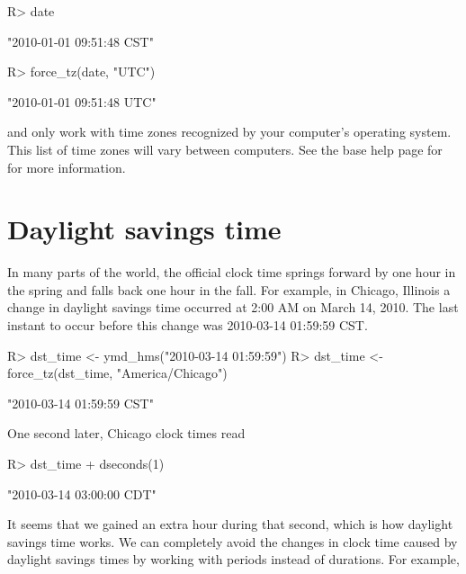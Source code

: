 \documentclass[article]{jss}
\begin{document}
\begin{CodeInput}
R> date
\end{CodeInput}
\begin{CodeOutput}
[1] "2010-01-01 09:51:48 CST"
\end{CodeOutput}

\begin{CodeInput}
R> force_tz(date, "UTC")
\end{CodeInput}
\begin{CodeOutput}
[1] "2010-01-01 09:51:48 UTC"
\end{CodeOutput}


 and  only work with time zones recognized by your computer's operating system. This list of time zones will vary between computers. See the base  help page for  for more information.

\section{Daylight savings time}
\label{sec:DST}

In many parts of the world, the official clock time springs forward by one hour in the spring and falls back one hour in the fall. For example, in Chicago, Illinois a change in daylight savings time occurred at 2:00 AM on March 14, 2010. The last instant to occur before this change was 2010-03-14 01:59:59 CST.

\begin{CodeInput}
R> dst_time <- ymd_hms("2010-03-14 01:59:59")
R> dst_time <- force_tz(dst_time, "America/Chicago")
\end{CodeInput}
\begin{CodeOutput}
[1] "2010-03-14 01:59:59 CST"
\end{CodeOutput}

One second later, Chicago clock times read

\begin{CodeInput}
R> dst_time + dseconds(1)
\end{CodeInput}
\begin{CodeOutput}
[1] "2010-03-14 03:00:00 CDT"
\end{CodeOutput}

It seems that we gained an extra hour during that second, which is how daylight savings time works. We can completely avoid the changes in clock time caused by daylight savings times by working with periods instead of durations. For example,
\end{document}

